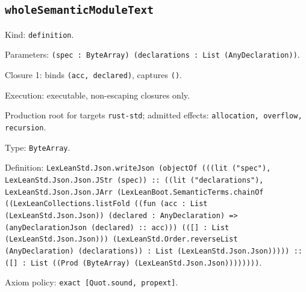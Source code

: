 \documentclass[11pt]{article}
\begin{document}
\subsection*{\texttt{wholeSemanticModuleText}}
\noindent Kind: \texttt{definition}.\par
\noindent Parameters: \texttt{(spec : ByteArray) (declarations : List (AnyDeclaration))}.\par
\noindent Closure 1: binds \texttt{(acc, declared)}, captures \texttt{()}.\par
\noindent Execution: executable, non-escaping closures only.\par
\noindent Production root for targets \texttt{rust-std}; admitted effects: \texttt{allocation, overflow, recursion}.\par
\noindent Type: \texttt{ByteArray}.\par
\noindent Definition: \texttt{LexLeanStd.Json.writeJson (objectOf (((lit ("spec"), LexLeanStd.Json.Json.JStr (spec)) :: ((lit ("declarations"), LexLeanStd.Json.Json.JArr (LexLeanBoot.SemanticTerms.chainOf ((LexLeanCollections.listFold ((fun (acc : List (LexLeanStd.Json.Json)) (declared : AnyDeclaration) => (anyDeclarationJson (declared) :: acc))) (([] : List (LexLeanStd.Json.Json))) (LexLeanStd.Order.reverseList (AnyDeclaration) (declarations)) : List (LexLeanStd.Json.Json))))) :: ([] : List ((Prod (ByteArray) (LexLeanStd.Json.Json))))))))}.\par
\noindent Axiom policy: \texttt{exact [Quot.sound, propext]}.\par
\end{document}
